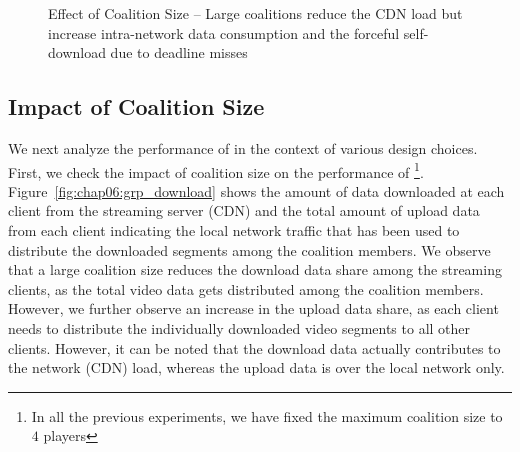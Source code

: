 \begin{figure}[!ht]
	\captionsetup[subfigure]{width=0.49\linewidth}
	\begin{center}
	\end{center}
\caption{\label{fig:chap06:grpsz}Effect of Coalition Size -- Large coalitions reduce the CDN load but increase intra-network data consumption and the forceful self-download due to deadline misses}
\end{figure}


\subsection{Impact of Coalition Size}
We next analyze the performance of {\our} in the context of various design choices. First, we check the impact of coalition size on the performance of {\our}\footnote{In all the previous experiments, we have fixed the maximum coalition size to $4$ players}. Figure~\ref{fig:chap06:grp_download} shows the amount of data downloaded at each client from the streaming server (CDN) and the total amount of upload data from each client indicating the local network traffic that has been used to distribute the downloaded segments among the coalition members. We observe that a large coalition size reduces the download data share among the streaming clients, as the total video data gets distributed among the coalition members. However, we further observe an increase in the upload data share, as each client needs to distribute the individually downloaded video segments to all other clients. However, it can be noted that the download data actually contributes to the network (CDN) load, whereas the upload data is over the local network only.

